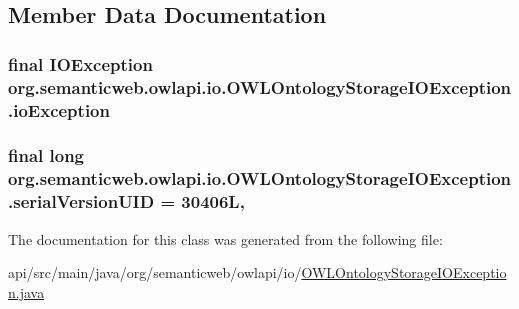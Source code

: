 \subsection{Member Data Documentation}
\hypertarget{classorg_1_1semanticweb_1_1owlapi_1_1io_1_1_o_w_l_ontology_storage_i_o_exception_a831b6f6f52574fe776e512d2a59206b2}{
\subsubsection[{io\-Exception}]{\setlength{\rightskip}{0pt plus 5cm}final I\-O\-Exception org.\-semanticweb.\-owlapi.\-io.\-O\-W\-L\-Ontology\-Storage\-I\-O\-Exception.\-io\-Exception\hspace{0.3cm}{\ttfamily [private]}}}\label{classorg_1_1semanticweb_1_1owlapi_1_1io_1_1_o_w_l_ontology_storage_i_o_exception_a831b6f6f52574fe776e512d2a59206b2}
\hypertarget{classorg_1_1semanticweb_1_1owlapi_1_1io_1_1_o_w_l_ontology_storage_i_o_exception_aece8bb4b4804bba9f3aa66fd5ec73150}{
\subsubsection[{serial\-Version\-U\-I\-D}]{\setlength{\rightskip}{0pt plus 5cm}final long org.\-semanticweb.\-owlapi.\-io.\-O\-W\-L\-Ontology\-Storage\-I\-O\-Exception.\-serial\-Version\-U\-I\-D = 30406\-L\hspace{0.3cm}{\ttfamily [static]}, {\ttfamily [private]}}}\label{classorg_1_1semanticweb_1_1owlapi_1_1io_1_1_o_w_l_ontology_storage_i_o_exception_aece8bb4b4804bba9f3aa66fd5ec73150}


The documentation for this class was generated from the following file\-:\begin{DoxyCompactItemize}
\item 
api/src/main/java/org/semanticweb/owlapi/io/\hyperlink{_o_w_l_ontology_storage_i_o_exception_8java}{O\-W\-L\-Ontology\-Storage\-I\-O\-Exception.\-java}\end{DoxyCompactItemize}
